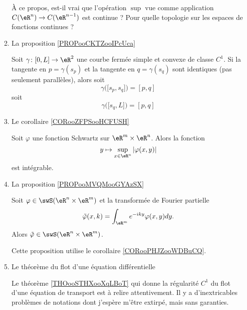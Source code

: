 \begin{enumerate}
À ce propos, est-il vrai que l'opération \( \sup\) vue comme application \( C(\eR^n)\to C(\eR^{n-1})\) est continue ? Pour quelle topologie sur les espaces de fonctions continues ?

\item La proposition \ref{PROPooCKTZooIPcUca}

\begin{proposition}   
    Soit \( \gamma\colon \mathopen[ 0 , L \mathclose]\to \eR^2\) une courbe fermée simple et convexe de classe \( C^1\). Si la tangente en \( p=\gamma(s_p)\) et la tangente en \( q=\gamma(s_q)\) sont identiques (pas seulement parallèles), alors soit 
    \begin{equation}
        \gamma\big( \mathopen[ s_p , s_q \mathclose] \big)=[p,q]
    \end{equation}
    soit
    \begin{equation}
        \gamma\big( \mathopen[ s_q , L \mathclose] \big)=[p,q]
    \end{equation}
\end{proposition}

\item
    Le corollaire \ref{CORooZFPSooHCFUSH}

    \begin{corollary}       \label{CORooPHJZooWDBuCQ}
    Soit \( \varphi\) une fonction Schwartz sur \( \eR^m\times \eR^n\). Alors la fonction
    \begin{equation}
        y\mapsto \sup_{x\in \eR^n}| \varphi(x,y) |
    \end{equation}
    est intégrable.
\end{corollary}

\item La proposition \ref{PROPooMVQMooGYAzSX}


\begin{proposition}
    Soit \( \varphi\in\swS(\eR^n\times \eR^m)\) et la transformée de Fourier partielle
    \begin{equation}
        \tilde \varphi(x,k)=\int_{\eR^m}  e^{-iky}\varphi(x,y)dy.
    \end{equation}
    Alors \( \tilde \varphi\in\swS(\eR^n\times \eR^m  )\).
\end{proposition}
Cette proposition utilise le corollaire \ref{CORooPHJZooWDBuCQ}.

\item Le théorème du flot d'une équation différentielle

    Le théorème \ref{THOooSTHXooXqLBoT} qui donne la régularité \( C^1\) du flot d'une équation de transport est à relire attentivement. Il y a d'inextricables problèmes de notations dont j'espère m'être extirpé, mais sans garanties.

\end{enumerate}

